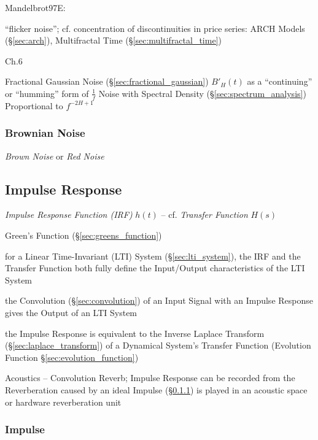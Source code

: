 Mandelbrot97E:

``flicker noise''; cf. concentration of discontinuities in price series: ARCH
Models (\S\ref{sec:arch}), Multifractal Time (\S\ref{sec:multifractal_time})

Ch.6

Fractional Gaussian Noise (\S\ref{sec:fractional_gaussian}) $B'_H(t)$ as a
``continuing'' or ``humming'' form of $\frac{1}{f}$ Noise with Spectral Density
(\S\ref{sec:spectrum_analysis}) Proportional to $f^{-2H+1}$



\subsubsection{Brownian Noise}\label{sec:brownian_noise}

\emph{Brown Noise} or \emph{Red Noise}



\subsection{Impulse Response}\label{sec:impulse_response}


\emph{Impulse Response Function (IRF)} $h(t)$ -- cf. \emph{Transfer Function}
$H(s)$

Green's Function (\S\ref{sec:greens_function})

for a Linear Time-Invariant (LTI) System (\S\ref{sec:lti_system}), the IRF and
the Transfer Function both fully define the Input/Output characteristics of the
LTI System

the Convolution (\S\ref{sec:convolution}) of an Input Signal with an Impulse
Response gives the Output of an LTI System

the Impulse Response is equivalent to the Inverse Laplace Transform
(\S\ref{sec:laplace_transform}) of a Dynamical System's Transfer Function
(Evolution Function \S\ref{sec:evolution_function})

Acoustics -- Convolution Reverb; Impulse Response can be recorded from the
Reverberation caused by an ideal Impulse (\S\ref{sec:impulse}) is played in an
acoustic space or hardware reverberation unit



\subsubsection{Impulse}\label{sec:impulse}

